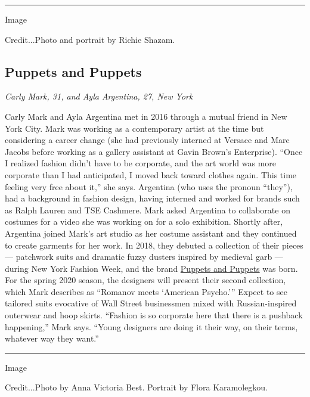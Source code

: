 \begin{center}\rule{0.5\linewidth}{\linethickness}\end{center}

Image

Credit...Photo and portrait by Richie Shazam.

\hypertarget{puppets-and-puppets}{%
\subsection{Puppets and Puppets}\label{puppets-and-puppets}}

\emph{Carly Mark, 31, and Ayla Argentina, 27, New York}

Carly Mark and Ayla Argentina met in 2016 through a mutual friend in New
York City. Mark was working as a contemporary artist at the time but
considering a career change (she had previously interned at Versace and
Marc Jacobs before working as a gallery assistant at Gavin Brown's
Enterprise). ``Once I realized fashion didn't have to be corporate, and
the art world was more corporate than I had anticipated, I moved back
toward clothes again. This time feeling very free about it,'' she says.
Argentina (who uses the pronoun ``they''), had a background in fashion
design, having interned and worked for brands such as Ralph Lauren and
TSE Cashmere. Mark asked Argentina to collaborate on costumes for a
video she was working on for a solo exhibition. Shortly after, Argentina
joined Mark's art studio as her costume assistant and they continued to
create garments for her work. In 2018, they debuted a collection of
their pieces --- patchwork suits and dramatic fuzzy dusters inspired by
medieval garb --- during New York Fashion Week, and the brand
\href{https://www.puppetsandpuppets.com/}{Puppets and Puppets} was born.
For the spring 2020 season, the designers will present their second
collection, which Mark describes as ``Romanov meets `American Psycho.'''
Expect to see tailored suits evocative of Wall Street businessmen mixed
with Russian-inspired outerwear and hoop skirts. ``Fashion is so
corporate here that there is a pushback happening,'' Mark says. ``Young
designers are doing it their way, on their terms, whatever way they
want.''

\begin{center}\rule{0.5\linewidth}{\linethickness}\end{center}

Image

Credit...Photo by Anna Victoria Best. Portrait by Flora Karamolegkou.

